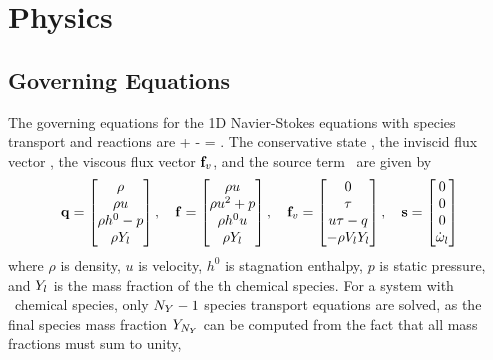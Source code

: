 \newpage

\section{Physics}\label{sec:physics}

\subsection{Governing Equations}\label{sec:govEqs}
The governing equations for the 1D Navier-Stokes equations with species transport and reactions are
\be\label{eq:govEqs}
     +  -  = \sourceVec.
\ee
The conservative state \consVec, the inviscid flux vector \fluxVec, the viscous flux vector $\mathbf{f}_v$, and the source term \sourceVec\ are given by
\begin{equation}\label{eq:govEqsTerms}
    \mathbf{q} = 
    \begin{bmatrix}
        \rho \\ \rho u \\ \rho h^0 - p \\ \rho Y_{l}
    \end{bmatrix}, \quad
    \mathbf{f} = 
    \begin{bmatrix}
        \rho u \\  \rho u^2 + p \\ \rho h^0 u \\ \rho Y_{l} 
    \end{bmatrix}, \quad
    \mathbf{f}_v = 
    \begin{bmatrix}
        0 \\ \tau \\ u \tau - q \\ -\rho V_{l} Y_{l}
    \end{bmatrix}, \quad
    \mathbf{s} = 
    \begin{bmatrix}
        0 \\ 0 \\ 0 \\ \dot{\omega}_{l}
    \end{bmatrix}
\end{equation}
where $\rho$ is density, $u$ is velocity, $h^0$ is stagnation enthalpy, $p$ is static pressure, and $Y_{l}$ is the mass fraction of the \speciesIdx th chemical species. For a system with \numSpecies\ chemical species, only ${N_Y} - 1$ species transport equations are solved, as the final species mass fraction $Y_{{N_Y}}$ can be computed from the fact that all mass fractions must sum to unity,
